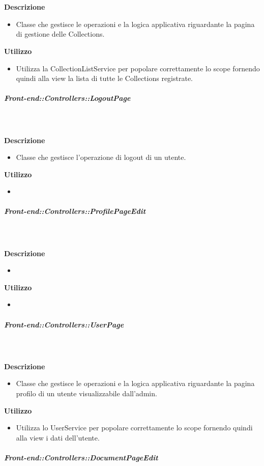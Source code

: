         \textbf{\\ \\ Descrizione} 
          \begin{itemize}
            \item[] Classe che gestisce le operazioni e la logica applicativa riguardante la pagina di gestione delle Collections.
          \end{itemize}      
        \textbf{Utilizzo}  
          \begin{itemize}
            \item[] Utilizza la CollectionListService per popolare correttamente lo scope fornendo quindi alla view la lista di tutte le Collections registrate.
          \end{itemize}
      \subparagraph{Front-end::Controllers::LogoutPage}
        
        \textbf{\\ \\ Descrizione} 
          \begin{itemize}
            \item[] Classe che gestisce l'operazione di logout di un utente.
          \end{itemize}      
        \textbf{Utilizzo}  
          \begin{itemize}
            \item[] 
          \end{itemize}
      \subparagraph{Front-end::Controllers::ProfilePageEdit}
        
        \textbf{\\ \\ Descrizione} 
          \begin{itemize}
            \item[] 
          \end{itemize}      
        \textbf{Utilizzo}  
          \begin{itemize}
            \item[] 
          \end{itemize}
      \subparagraph{Front-end::Controllers::UserPage}
        
        \textbf{\\ \\ Descrizione} 
          \begin{itemize}
            \item[] Classe che gestisce le operazioni e la logica applicativa riguardante la pagina profilo di un utente visualizzabile dall'admin.
          \end{itemize}      
        \textbf{Utilizzo}  
          \begin{itemize}
            \item[] Utilizza lo UserService per popolare correttamente lo scope fornendo quindi alla view i dati dell'utente.
          \end{itemize}
      \subparagraph{Front-end::Controllers::DocumentPageEdit}
        
